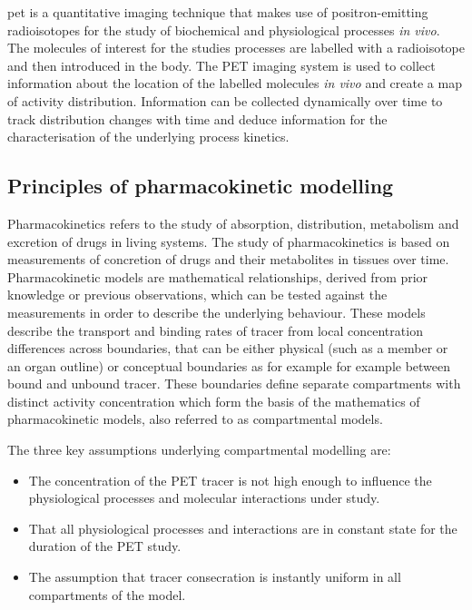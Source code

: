 
\Gls{pet} is a quantitative imaging technique that makes use of 
positron-emitting radioisotopes for the study of biochemical and physiological processes \textit{in vivo}. The molecules of interest for the studies processes are labelled with a radioisotope and then introduced in the body. The PET imaging system is used to collect information about the location of the labelled molecules \textit{in vivo} and create a map of activity distribution. Information can be collected dynamically over time to track distribution changes with time and deduce information for the characterisation of the underlying process kinetics. 

\subsection{Principles of pharmacokinetic modelling}
Pharmacokinetics refers to the study of absorption, distribution, metabolism and excretion of drugs in living systems. The study of pharmacokinetics is based on measurements of concretion of drugs and their metabolites in tissues over time. Pharmacokinetic models are mathematical relationships, derived from prior knowledge or previous observations, which can be tested against the measurements in order to describe the underlying behaviour. These models describe the transport and binding rates of tracer from local concentration differences across boundaries, that can be either physical (such as a member or an organ outline) or conceptual boundaries as for example for example between bound and unbound tracer. These boundaries define separate compartments with distinct activity concentration which form the basis of the mathematics of pharmacokinetic models, also referred to as compartmental models.\par

The three key assumptions underlying compartmental modelling are:
\begin{itemize}
\item  The concentration of the PET tracer is not high enough to influence the physiological processes and molecular interactions under study. 
\item That all physiological processes and interactions are in constant state for the duration of the PET study. 
\item  The assumption that tracer consecration is instantly uniform in all compartments of the model.
\end{itemize}

